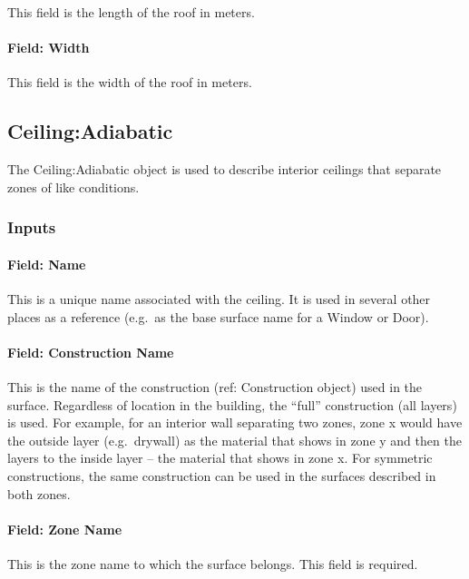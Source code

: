 This field is the length of the roof in meters.

\paragraph{Field: Width}\label{field-width}

This field is the width of the roof in meters.

\subsection{Ceiling:Adiabatic}\label{ceilingadiabatic}

The Ceiling:Adiabatic object is used to describe interior ceilings that separate zones of like conditions.

\subsubsection{Inputs}\label{inputs-9-024}

\paragraph{Field: Name}\label{field-name-5-026}

This is a unique name associated with the ceiling. It is used in several other places as a reference (e.g.~as the base surface name for a Window or Door).

\paragraph{Field: Construction Name}\label{field-construction-name-5}

This is the name of the construction (ref: Construction object) used in the surface. Regardless of location in the building, the ``full'' construction (all layers) is used. For example, for an interior wall separating two zones, zone x would have the outside layer (e.g.~drywall) as the material that shows in zone y and then the layers to the inside layer -- the material that shows in zone x. For symmetric constructions, the same construction can be used in the surfaces described in both zones.

\paragraph{Field: Zone Name}\label{field-zone-name-5-005}

This is the zone name to which the surface belongs. This field is required.

